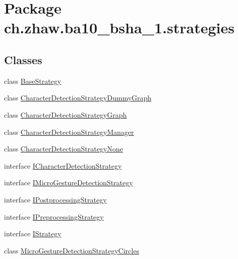\hypertarget{namespacech_1_1zhaw_1_1ba10__bsha__1_1_1strategies}{
\section{Package ch.zhaw.ba10\_\-bsha\_\-1.strategies}
\label{namespacech_1_1zhaw_1_1ba10__bsha__1_1_1strategies}
}
\subsection*{Classes}
\begin{DoxyCompactItemize}
\item 
class \hyperlink{classch_1_1zhaw_1_1ba10__bsha__1_1_1strategies_1_1BaseStrategy}{BaseStrategy}
\item 
class \hyperlink{classch_1_1zhaw_1_1ba10__bsha__1_1_1strategies_1_1CharacterDetectionStrategyDummyGraph}{CharacterDetectionStrategyDummyGraph}
\item 
class \hyperlink{classch_1_1zhaw_1_1ba10__bsha__1_1_1strategies_1_1CharacterDetectionStrategyGraph}{CharacterDetectionStrategyGraph}
\item 
class \hyperlink{classch_1_1zhaw_1_1ba10__bsha__1_1_1strategies_1_1CharacterDetectionStrategyManager}{CharacterDetectionStrategyManager}
\item 
class \hyperlink{classch_1_1zhaw_1_1ba10__bsha__1_1_1strategies_1_1CharacterDetectionStrategyNone}{CharacterDetectionStrategyNone}
\item 
interface \hyperlink{interfacech_1_1zhaw_1_1ba10__bsha__1_1_1strategies_1_1ICharacterDetectionStrategy}{ICharacterDetectionStrategy}
\item 
interface \hyperlink{interfacech_1_1zhaw_1_1ba10__bsha__1_1_1strategies_1_1IMicroGestureDetectionStrategy}{IMicroGestureDetectionStrategy}
\item 
interface \hyperlink{interfacech_1_1zhaw_1_1ba10__bsha__1_1_1strategies_1_1IPostprocessingStrategy}{IPostprocessingStrategy}
\item 
interface \hyperlink{interfacech_1_1zhaw_1_1ba10__bsha__1_1_1strategies_1_1IPreprocessingStrategy}{IPreprocessingStrategy}
\item 
interface \hyperlink{interfacech_1_1zhaw_1_1ba10__bsha__1_1_1strategies_1_1IStrategy}{IStrategy}
\item 
class \hyperlink{classch_1_1zhaw_1_1ba10__bsha__1_1_1strategies_1_1MicroGestureDetectionStrategyCircles}{MicroGestureDetectionStrategyCircles}
\item 

\end{DoxyCompactItemize}
